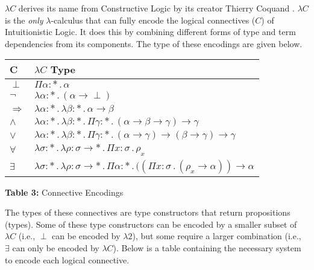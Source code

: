 \documentclass[9pt,preprint,nocopyrightspace,computermodern]{sigplanconf} %
\begin{document}
\(\lambda C\) derives its name from Constructive Logic by its creator Thierry Coquand \cite{coq1}.
\(\lambda C\) is the \textit{only} \(\lambda\)-calculus that can fully encode the
logical connectives (\(C\)) of Intuitionistic Logic. It does this by combining
different forms of type and term dependencies from its components. The type of
these encodings are given below.
\begin{center}
  \begin{tabular}{ m{0.3cm} | m{7.4cm}  } 
    \textbf{C} & \textbf{\(\lambda C\) Type} \\[0.1cm]
    \hline      
    \(\perp\)  & \(\Pi\alpha : *\,.\,\alpha\)  \\[0.1cm]
    \hline
    \(\neg\)  & \(\lambda\alpha : *\,.\,(\alpha\rightarrow\perp)\)  \\[0.1cm]
    \hline
    \(\Rightarrow\)  & \(\lambda\alpha : *\,.\,\lambda\beta : *\,.\,\alpha\rightarrow\beta\)  \\[0.1cm]
    \hline
    \(\wedge\)  & \(\lambda\alpha : *\,.\,\lambda\beta : *\,.\,\Pi\gamma : *\,.\,(\alpha\rightarrow\beta\rightarrow\gamma)\rightarrow\gamma\)  \\[0.1cm]
    \hline
    \(\vee\)  & \(\lambda\alpha : *\,.\,\lambda\beta : *\,.\,\Pi\gamma : *\,.\,(\alpha\rightarrow\gamma)\rightarrow(\beta\rightarrow\gamma)\rightarrow\gamma\)  \\[0.1cm]
    \hline
    \(\forall\)  & \(\lambda\sigma : *\,.\,\lambda\rho : \sigma\rightarrow *\,.\,\Pi x : \sigma\,.\,\rho_x\)  \\[0.1cm]
    \hline
    \(\exists\)  & \(\lambda\sigma :*\,.\,\lambda\rho : \sigma\rightarrow *\,.\,\Pi\alpha : *\,.\,((\Pi x : \sigma\,.\,(\rho_x\rightarrow\alpha))\rightarrow\alpha\)  \\[0.1cm]
  \end{tabular}\par\smallskip
  \textbf{Table 3:} Connective Encodings
\end{center}
The types of these connectives are type constructors that return propositions
(types). Some of these type constructors can be encoded by a smaller subset
of \(\lambda C\) (i.e., \(\perp\) can be encoded by \(\lambda 2\)),
but some require a larger combination (i.e., \(\exists\) can only be encoded by
\(\lambda C\)). Below is a table containing the necessary system to encode each logical connective.
\end{document}
